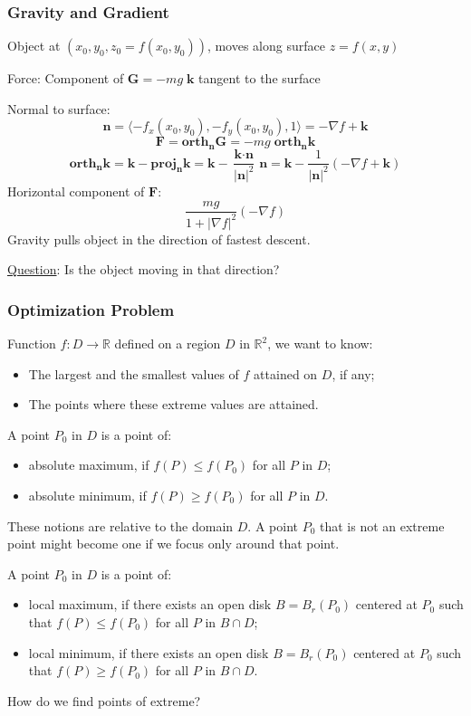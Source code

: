 \begin{frame}
  \frametitle{Gravity and Gradient}

  Object at $(x_0,y_0,z_0 = f(x_0,y_0))$, moves along surface $z=f(x,y)$
  \pause

  Force: Component of $\textbf{G}= -mg\; \textbf{k}$ tangent to the surface

  \pause
  Normal to surface:
  $$\textbf{n} = \langle -f_x(x_0,y_0), -f_y(x_0,y_0), 1\rangle = -\nabla f + \textbf{k}$$
  \pause
  $$\textbf{F} = \textbf{orth}_{\bm{n}} \textbf{G} =
  -mg \; \textbf{orth}_{\bm{n}} \textbf{k}$$
  \pause
  $$\textbf{orth}_{\bm{n}} \textbf{k} =
  \textbf{k} - \textbf{proj}_{\bm{n}} \textbf{k} =
  \textbf{k} - \frac{\textbf{k}\cdot \textbf{n}}{|\textbf{n}|^2} \, \textbf{n} =
  \textbf{k} - \frac{1}{|\textbf{n}|^2} (-\nabla f + \textbf{k})
  $$
\pause
Horizontal component of $\textbf{F}$:
%
$$\frac{mg}{1+|\nabla f|^2} (-\nabla f)$$
\pause
Gravity pulls object in the direction of fastest descent.

\pause
\underline{Question}: Is the object moving in that direction?

\end{frame}

\begin{frame}
  \frametitle{Optimization Problem}

  Function $f \colon D \to \mathbb{R}$ defined on a region $D$ in $\mathbb{R}^2$, we want to know:
%
\begin{itemize}
  \item The largest and the smallest values of $f$ attained on $D$, if any;
  \item The points where these extreme values are attained.
\end{itemize}

\pause
A point $P_0$ in $D$ is a point of:
\begin{itemize}
  \item absolute maximum, if $f(P) \leqslant f(P_0)$ for all $P$ in $D$;
  \item absolute minimum, if $f(P) \geqslant f(P_0)$ for all $P$ in $D$.
\end{itemize}

\pause
These notions are relative to the domain $D$. A point $P_0$ that is not an extreme point might become one if we focus only around that point.

\pause
A point $P_0$ in $D$ is a point of:
\begin{itemize}
  \item local maximum, if there exists an open disk $B=B_r(P_0)$ centered at $P_0$ such that $f(P) \leqslant f(P_0)$ for all $P$ in $B \cap D$;
  \item local minimum, if there exists an open disk $B=B_r(P_0)$ centered at $P_0$ such that $f(P) \geqslant f(P_0)$ for all $P$ in $B \cap D$.
\end{itemize}

\pause
How do we find points of extreme?
\end{frame}

